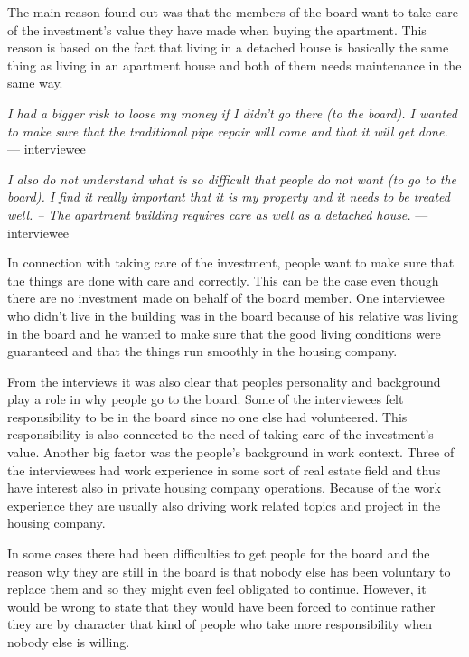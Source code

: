 The main reason found out was that the members of the board want to take care of the investment's value they have made when buying the apartment. This reason is based on the fact that living in a detached house is basically the same thing as living in an apartment house and both of them needs maintenance in the same way.

\begin{displayquote}
\textit{I had a bigger risk to loose my money if I didn't go there (to the board). I wanted to make sure that the traditional pipe repair will come and that it will get done.} --- interviewee
\end{displayquote}

\begin{displayquote}
\textit{I also do not understand what is so difficult that people do not want (to go to the board). I find it really important that it is my property and it needs to be treated well. -- The apartment building requires care as well as a detached house.} --- interviewee
\end{displayquote}

In connection with taking care of the investment, people want to make sure that the things are done with care and correctly. This can be the case even though there are no investment made on behalf of the board member. One interviewee who didn't live in the building was in the board because of his relative was living in the board and he wanted to make sure that the good living conditions were guaranteed and that the things run smoothly in the housing company.

From the interviews it was also clear that peoples personality and background play a role in why people go to the board. Some of the interviewees felt responsibility to be in the board since no one else had volunteered. This responsibility is also connected to the need of taking care of the investment's value. Another big factor was the people's background in work context. Three of the interviewees had work experience in some sort of real estate field and thus have interest also in private housing company operations. Because of the work experience they are usually also driving work related topics and project in the housing company.

In some cases there had been difficulties to get people for the board and the reason why they are still in the board is that nobody else has been voluntary to replace them and so they might even feel obligated to continue. However, it would be wrong to state that they would have been forced to continue rather they are by character that kind of people who take more responsibility when nobody else is willing.


